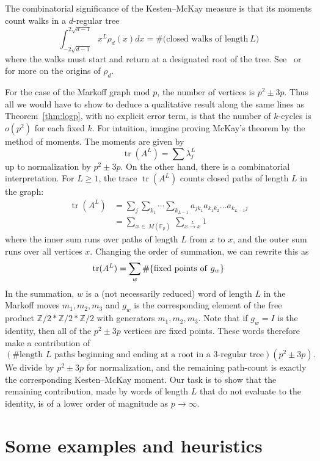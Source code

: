 \documentclass[10pt]{amsart}
\theoremstyle{definition}\newtheorem{defi}[theo]{Definition}\newtheorem{rema}[theo]{Remark}\newtheorem{exam}[theo]{Example}\newtheorem{exem}[theo]{Example}\newtheorem{nota}[theo]{Notation}
\newcommand{\Z}{\mathbb{Z}}
\newcommand{\F}{\mathbb{F}}
\DeclareMathOperator{\tr}{tr}
\begin{document}
The combinatorial significance of the Kesten--McKay measure is that its moments count walks in a $d$-regular tree
\[
\int_{-2\sqrt{d-1}}^{2\sqrt{d-1}} x^L \rho_d(x) dx = \#\big(\text{closed walks of length} \ L \big)
\]
where the walks must start and return at a designated root of the tree. See~\cite[p.~205--213]{M} or~\cite[p.~14]{K} for more on the origins of $\rho_d$.

For the case of the Markoff graph mod $p$, the number of vertices is $p^2 \pm 3p$. Thus all we would have to show to deduce a qualitative result along the same lines as Theorem~\ref{thm:logp}, with no explicit error term, is that the number of $k$-cycles is $o(p^2)$ for each fixed $k$. For intuition, imagine proving McKay's theorem by the method of moments. The moments are given by
\[
\tr(A^L) = \sum \lambda_j^L
\]
up to normalization by $p^2 \pm 3p$. On the other hand, there is a combinatorial interpretation. For $L \geq 1$, the trace $\tr(A^L)$ counts closed paths of length $L$ in the graph:
\begin{align*}
\tr(A^L) &= \sum_{j} \sum_{k_1} \cdots \sum_{k_{L-1}} a_{jk_1}a_{k_1k_2} \ldots a_{k_{L-1} j} \\
&= \sum_{x\,\in\,M(\F_p)}\,\sum_{x \overset{L}{\rightarrow} x } 1
\end{align*}
where the inner sum runs over paths of length $L$ from $x$ to $x$, and the outer sum runs over all vertices $x$. Changing the order of summation, we can rewrite this as
\[
\tr(A^L) = \sum_w \#\{ {\rm fixed \ points \ of \ } g_w \}
\]
In the summation, $w$ is a (not necessarily reduced) word of length $L$ in the Markoff moves $m_1, m_2, m_3$ and $g_w$ is the corresponding element of the free product $\Z/2 * \Z/2 * \Z/2$ with generators $m_1, m_2, m_3$. Note that if $g_w = I$ is the identity, then all of the $p^2 \pm 3p$ vertices are fixed points. These words therefore make a contribution of
\[
(\#\text{length $L$ paths beginning and ending at a root in a $3$-regular tree})(p^2 \pm 3p).
\]
We divide by $p^2 \pm 3p$ for normalization, and the remaining path-count is exactly the corresponding Kesten--McKay moment. Our task is to show that the remaining contribution, made by words of length $L$ that do not evaluate to the identity, is of a lower order of magnitude as $p \rightarrow \infty$.

\section{Some examples and heuristics} \label{sec:examples}
\end{document}

